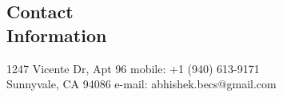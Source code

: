 \documentclass[margin,line]{resume}
\begin{document}
\begin{resume}

%

    \section{\mysidestyle Contact\\Information}

    1247 Vicente Dr, Apt 96                         \hfill mobile: +1 (940) 613-9171          \vspace{0mm}\\\vspace{0mm}%
    Sunnyvale, CA 94086      \hfill e-mail: abhishek.becs@gmail.com  \vspace{0mm}\\\vspace{-6mm}%



\end{resume}
\end{document}
